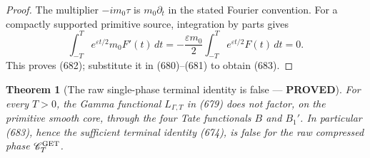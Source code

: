 \documentclass[11pt]{article}
\newtheorem{theorem}{Theorem}
\newcommand{\PROVED}{\textcolor{green!45!black}{\textbf{PROVED}}}
\begin{document}
\begin{proof}
The multiplier \(-im_0\tau\) is \(m_0\partial_t\) in the stated Fourier
convention.  For a compactly supported primitive source, integration by
parts gives
\[
 \int_{-T}^Te^{\varepsilon t/2}m_0F'(t)\,dt
 =-\frac{\varepsilon m_0}{2}
   \int_{-T}^Te^{\varepsilon t/2}F(t)\,dt=0.
\]
This proves (682); substitute it in (680)--(681) to obtain (683).
\end{proof}

\begin{theorem}[The raw single-phase terminal identity is false ---
\PROVED]
For every \(T>0\), the Gamma functional \(L_{\Gamma,T}\) in (679) does not
factor, on the primitive smooth core, through the four Tate functionals
\(B\) and \(B_1'\).  In particular (683), hence the sufficient terminal
identity (674), is false for the raw compressed phase
\(\mathscr C_T^{\rm GET}\).
\end{theorem}
\end{document}
